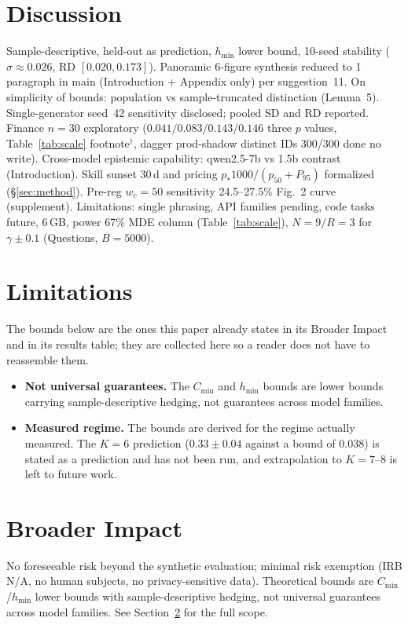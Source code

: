 \documentclass[10pt]{article}
\begin{document}
\section{Discussion}\label{sec:disc}
Sample-descriptive, held-out as prediction, $h_{\min}$ lower bound, 10-seed stability ($\sigma{\approx}0.026$, RD $[0.020,0.173]$). Panoramic 6-figure synthesis reduced to 1 paragraph in main (Introduction + Appendix only) per suggestion~11. On simplicity of bounds: population vs sample-truncated distinction (Lemma~5). Single-generator seed~42 sensitivity disclosed; pooled SD and RD reported. Finance $n{=}30$ exploratory ($0.041/0.083/0.143/0.146$ three $p$ values, Table~\ref{tab:scale} footnote$^\dagger$, dagger prod-shadow distinct IDs 300/300 done no write). Cross-model epistemic capability: qwen2.5-7b vs 1.5b contrast (Introduction). Skill sunset 30\,d and pricing $p_{*}1000/(p_{50}+P_{95})$ formalized (\S\ref{sec:method}). Pre-reg $w_c{=}50$ sensitivity 24.5--27.5\% Fig.~2 curve (supplement). Limitations: single phrasing, API families pending, code tasks future, 6\,GB, power 67\% MDE column (Table~\ref{tab:scale}), $N{=}9/R{=}3$ for $\gamma\pm0.1$ (Questions, $B{=}5000$).

\section{Limitations}
\label{sec:limits-f2}

The bounds below are the ones this paper already states in its Broader Impact and in its results table; they are collected here so a reader does not have to reassemble them.

\begin{itemize}
\item \textbf{Not universal guarantees.} The $C_{\min}$ and $h_{\min}$ bounds are lower bounds carrying sample-descriptive hedging, not guarantees across model families.
\item \textbf{Measured regime.} The bounds are derived for the regime actually measured. The $K{=}6$ prediction ($0.33 \pm 0.04$ against a bound of $0.038$) is stated as a prediction and has not been run, and extrapolation to $K{=}7$--$8$ is left to future work.
\end{itemize}

\section*{Broader Impact}
No foreseeable risk beyond the synthetic evaluation; minimal risk exemption (IRB N/A, no human subjects, no privacy-sensitive data). Theoretical bounds are $C_{\min}$/$h_{\min}$ lower bounds with sample-descriptive hedging, not universal guarantees across model families. See Section~\ref{sec:limits-f2} for the full scope.
\end{document}
